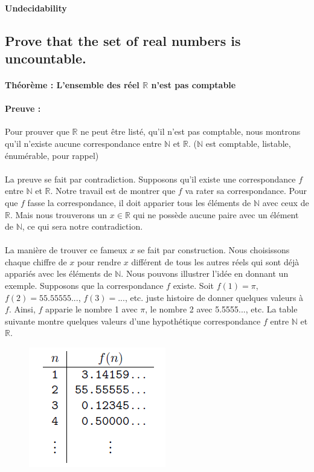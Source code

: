 \paragraph{Undecidability}
\subsection{ Prove that the set of real numbers is uncountable. }
\paragraph{Théorème : L'ensemble des réel $\mathbb{R}$ n'est pas comptable}
\paragraph{Preuve : }
Pour prouver que $\mathbb{R}$ ne peut être listé, qu'il n'est pas comptable, nous montrons qu'il n'existe aucune correspondance entre $\mathbb{N}$ et $\mathbb{R}$. ($\mathbb{N}$ est comptable, listable, énumérable, pour rappel)
\paragraph{}
La preuve se fait par contradiction. Supposons qu'il existe une correspondance $f$ entre $\mathbb{N}$ et $\mathbb{R}$. Notre travail est de montrer que $f$ va rater sa correspondance. Pour que $f$ fasse la correspondance, il doit apparier tous les éléments de $\mathbb{N}$ avec ceux de $\mathbb{R}$. Mais nous trouverons un $x \in \mathbb{R}$ qui ne possède aucune paire avec un élément de $\mathbb{N}$, ce qui sera notre contradiction. 

\paragraph{}
La manière de trouver ce fameux $x$ se fait par construction. Nous choisissons chaque chiffre de $x$ pour rendre $x$ différent de tous les autres réels qui sont déjà appariés avec les éléments de $\mathbb{N}$. Nous pouvons illustrer l'idée en donnant un exemple. Supposons que la correspondance $f$ existe. Soit $f(1) = \pi$, $f(2) = 55.55555...$, $f(3) = ...$, etc. juste histoire de donner quelques valeurs à $f$. Ainsi, $f$ apparie le nombre 1 avec $\pi$, le nombre 2 avec 5.5555..., etc. La table suivante montre quelques valeurs d'une hypothétique correspondance $f$ entre $\mathbb{N}$ et $\mathbb{R}$.

\begin{figure}[H]
   \centering
   \includegraphics{img_3_7__0}
\end{figure}

